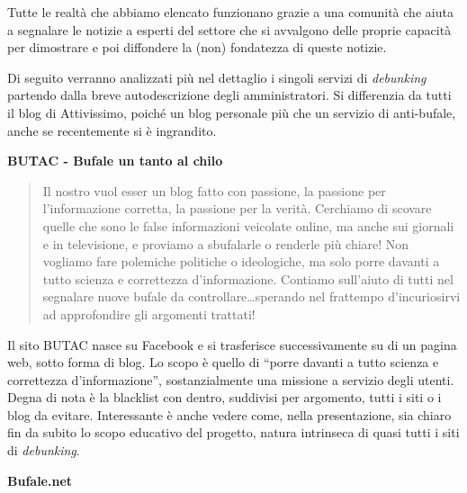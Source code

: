 \documentclass{article}
\begin{document}
Tutte le realtà che abbiamo elencato funzionano grazie a una comunità che aiuta a segnalare le notizie a esperti del settore che si avvalgono delle proprie capacità per dimostrare e poi diffondere la (non) fondatezza di queste notizie.

Di seguito verranno analizzati più nel dettaglio i singoli servizi di \textit{debunking} partendo dalla breve autodescrizione degli amministratori. Si differenzia da tutti il blog di Attivissimo, poiché un blog personale più che un servizio di anti-bufale, anche se recentemente si è ingrandito.

\vspace{0.5cm}

\textbf{BUTAC - Bufale un tanto al chilo}

\begin{quote} 
Il nostro vuol esser un blog fatto con passione, la passione per l’informazione corretta, la passione per la verità. Cerchiamo di scovare quelle che sono le false informazioni veicolate online, ma anche sui giornali e in televisione, e proviamo a sbufalarle o renderle più chiare! Non vogliamo fare polemiche politiche o ideologiche, ma solo porre davanti a tutto scienza e correttezza d’informazione. Contiamo sull’aiuto di tutti nel segnalare nuove bufale da controllare…sperando nel frattempo d’incuriosirvi ad approfondire gli argomenti trattati!
\end{quote}

Il sito BUTAC nasce su Facebook e si trasferisce successivamente su di un pagina web, sotto forma di blog. Lo scopo è quello di “porre davanti a tutto scienza e correttezza d’informazione”, sostanzialmente una missione a servizio degli utenti. Degna di nota è la blacklist con dentro, suddivisi per argomento, tutti i siti o i blog da evitare. Interessante è anche vedere come, nella presentazione, sia chiaro fin da subito lo scopo educativo del progetto, natura intrinseca di quasi tutti i siti di \textit{debunking}.

\vspace{0.5 cm}

\textbf{Bufale.net}
\end{document}
